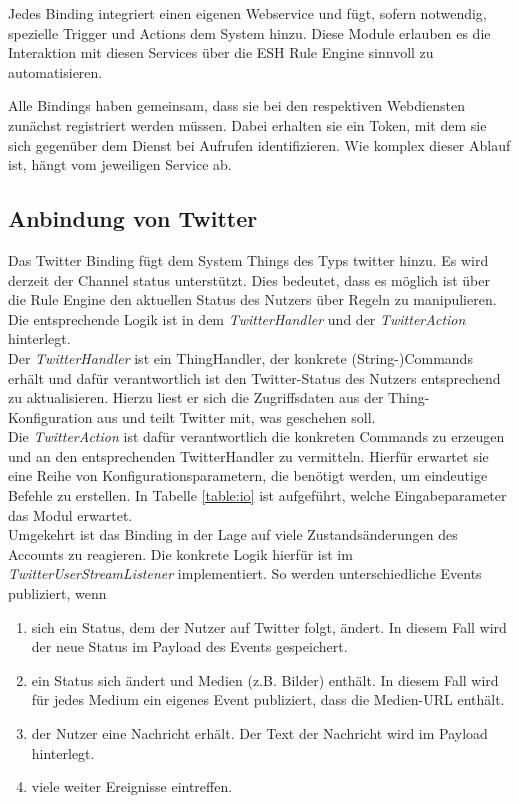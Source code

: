 Jedes Binding integriert einen eigenen Webservice und fügt, sofern notwendig, spezielle Trigger und Actions dem System hinzu. Diese Module erlauben es die Interaktion mit diesen Services über die ESH Rule Engine sinnvoll zu automatisieren.

Alle Bindings haben gemeinsam, dass sie bei den respektiven Webdiensten zunächst registriert werden müssen. Dabei erhalten sie ein Token, mit dem sie sich gegenüber dem Dienst bei Aufrufen identifizieren. Wie komplex dieser Ablauf ist, hängt vom jeweiligen Service ab.

\subsection{Anbindung von Twitter}
Das Twitter Binding fügt dem System Things des Typs \glqq twitter\grqq{} hinzu. Es wird derzeit der Channel \glqq status\grqq{} unterstützt. Dies bedeutet, dass es möglich ist über die Rule Engine den aktuellen Status des Nutzers über Regeln zu manipulieren. Die entsprechende Logik ist in dem \textit{TwitterHandler} und der \textit{TwitterAction} hinterlegt. \\

Der \textit{TwitterHandler} ist ein ThingHandler, der konkrete (String-)Commands erhält und dafür verantwortlich ist den Twitter-Status des Nutzers entsprechend zu aktualisieren.  Hierzu liest er sich die Zugriffsdaten aus der Thing-Konfiguration aus und teilt Twitter mit, was geschehen soll.\\

Die \textit{TwitterAction} ist dafür verantwortlich die konkreten Commands zu erzeugen und an den entsprechenden TwitterHandler zu vermitteln. Hierfür erwartet sie eine Reihe von Konfigurationsparametern, die benötigt werden, um eindeutige Befehle zu erstellen. In Tabelle \ref{table:io} ist aufgeführt, welche Eingabeparameter das Modul erwartet.\\

Umgekehrt ist das Binding in der Lage auf viele Zustandsänderungen des Accounts zu reagieren. Die konkrete Logik hierfür ist im \textit{TwitterUserStreamListener} implementiert. So werden unterschiedliche Events publiziert, wenn

\begin{enumerate}
\item sich ein Status, dem der Nutzer auf Twitter folgt, ändert. In diesem Fall wird der neue Status im Payload des Events gespeichert.
\item ein Status sich ändert und Medien (z.B. Bilder) enthält. In diesem Fall wird für jedes Medium ein eigenes Event publiziert, dass die Medien-URL enthält.
\item der Nutzer eine Nachricht erhält. Der Text der Nachricht wird im Payload hinterlegt.
\item viele weiter Ereignisse eintreffen.
\end{enumerate}
 
